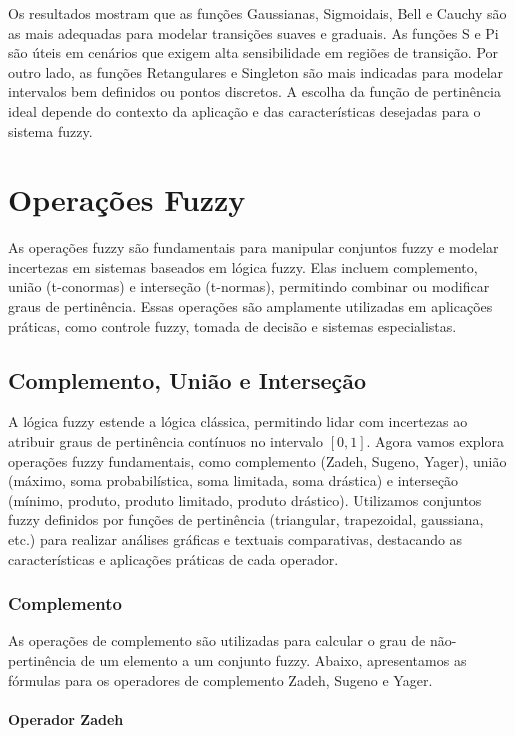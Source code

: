 \documentclass[a4paper,12pt]{article}
\begin{document}
Os resultados mostram que as funções Gaussianas, Sigmoidais, Bell e Cauchy são as mais adequadas para modelar transições suaves e graduais. As funções S e Pi são úteis em cenários que exigem alta sensibilidade em regiões de transição. Por outro lado, as funções Retangulares e Singleton são mais indicadas para modelar intervalos bem definidos ou pontos discretos. A escolha da função de pertinência ideal depende do contexto da aplicação e das características desejadas para o sistema fuzzy.


\section{Operações Fuzzy}

As operações fuzzy são fundamentais para manipular conjuntos fuzzy e modelar incertezas em sistemas baseados em lógica fuzzy. Elas incluem complemento, união (t-conormas) e interseção (t-normas), permitindo combinar ou modificar graus de pertinência. Essas operações são amplamente utilizadas em aplicações práticas, como controle fuzzy, tomada de decisão e sistemas especialistas.

\subsection{Complemento, União e Interseção}

A lógica fuzzy estende a lógica clássica, permitindo lidar com incertezas ao atribuir graus de pertinência contínuos no intervalo $[0, 1]$. Agora vamos explora operações fuzzy fundamentais, como complemento (Zadeh, Sugeno, Yager), união (máximo, soma probabilística, soma limitada, soma drástica) e interseção (mínimo, produto, produto limitado, produto drástico). Utilizamos conjuntos fuzzy definidos por funções de pertinência (triangular, trapezoidal, gaussiana, etc.) para realizar análises gráficas e textuais comparativas, destacando as características e aplicações práticas de cada operador.



\subsubsection{Complemento}

As operações de complemento são utilizadas para calcular o grau de não-pertinência de um elemento a um conjunto fuzzy. Abaixo, apresentamos as fórmulas para os operadores de complemento Zadeh, Sugeno e Yager.


\paragraph{Operador Zadeh}
\end{document}
